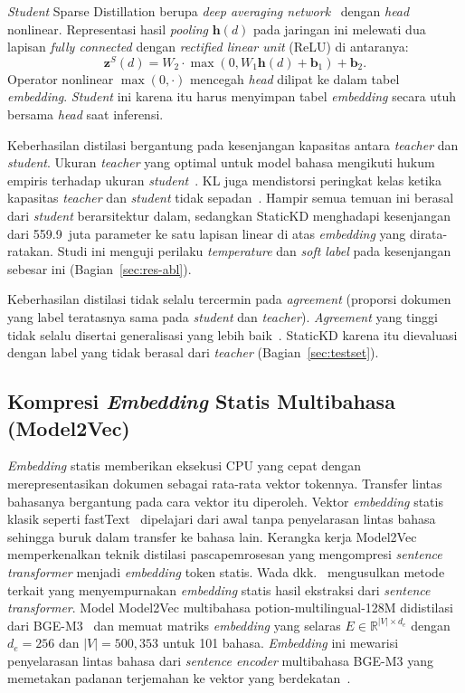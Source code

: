 \documentclass{ieeeaccess}
\newcommand{\en}[1]{\textit{#1}}
\begin{document}
\en{Student} Sparse Distillation berupa \en{deep averaging network}~\cite{iyyer2015dan} dengan \en{head} nonlinear. Representasi hasil \en{pooling} $\mathbf{h}(d)$ pada jaringan ini melewati dua lapisan \en{fully connected} dengan \en{rectified linear unit} (ReLU) di antaranya:
\begin{equation}
\mathbf{z}^S(d)=W_2\cdot\max(0,W_1\mathbf{h}(d)+\mathbf{b}_1)+\mathbf{b}_2.
\label{eq:mlp}
\end{equation}
Operator nonlinear $\max(0,\cdot)$ mencegah \en{head} dilipat ke dalam tabel \en{embedding}. \en{Student} ini karena itu harus menyimpan tabel \en{embedding} secara utuh bersama \en{head} saat inferensi.

Keberhasilan distilasi bergantung pada kesenjangan kapasitas antara \en{teacher} dan \en{student}. Ukuran \en{teacher} yang optimal untuk model bahasa mengikuti hukum empiris terhadap ukuran \en{student}~\cite{zhang2025law}. KL juga mendistorsi peringkat kelas ketika kapasitas \en{teacher} dan \en{student} tidak sepadan~\cite{wang2026rckd}. Hampir semua temuan ini berasal dari \en{student} berarsitektur dalam, sedangkan StaticKD menghadapi kesenjangan dari 559.9~juta parameter ke satu lapisan linear di atas \en{embedding} yang dirata-ratakan. Studi ini menguji perilaku \en{temperature} dan \en{soft label} pada kesenjangan sebesar ini (Bagian~\ref{sec:res-abl}).

Keberhasilan distilasi tidak selalu tercermin pada \en{agreement} (proporsi dokumen yang label teratasnya sama pada \en{student} dan \en{teacher}). \en{Agreement} yang tinggi tidak selalu disertai generalisasi yang lebih baik~\cite{stanton2021kd}. StaticKD karena itu dievaluasi dengan label yang tidak berasal dari \en{teacher} (Bagian~\ref{sec:testset}).

\subsection{Kompresi \en{Embedding} Statis Multibahasa (Model2Vec)}
\label{sec:rw-static}
\en{Embedding} statis memberikan eksekusi CPU yang cepat dengan merepresentasikan dokumen sebagai rata-rata vektor tokennya. Transfer lintas bahasanya bergantung pada cara vektor itu diperoleh. Vektor \en{embedding} statis klasik seperti fastText~\cite{joulin2017bag} dipelajari dari awal tanpa penyelarasan lintas bahasa sehingga buruk dalam transfer ke bahasa lain. Kerangka kerja Model2Vec~\cite{tulkens2024model2vec} memperkenalkan teknik distilasi pascapemrosesan yang mengompresi \en{sentence transformer} menjadi \en{embedding} token statis. Wada dkk.~\cite{wada2025static} mengusulkan metode terkait yang menyempurnakan \en{embedding} statis hasil ekstraksi dari \en{sentence transformer}. Model Model2Vec multibahasa potion-multilingual-128M didistilasi dari BGE-M3~\cite{chen2024bgem3} dan memuat matriks \en{embedding} yang selaras $E\in\mathbb{R}^{|V|\times d_e}$ dengan $d_e=256$ dan $|V|=500{,}353$ untuk 101 bahasa. \en{Embedding} ini mewarisi penyelarasan lintas bahasa dari \en{sentence encoder} multibahasa BGE-M3 yang memetakan padanan terjemahan ke vektor yang berdekatan~\cite{chen2024bgem3}.
\end{document}
